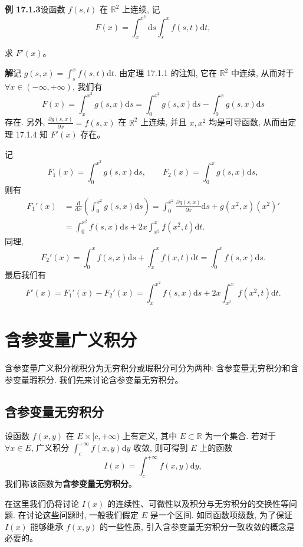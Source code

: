 \documentclass[UTF8, 12pt, fontset=fandol, oneside]{ctexart}
\begin{document}
\noindent\textbf{例 17.1.3}\quad 设函数 $f(s,t)$ 在 $\mathbb R^2$ 上连续, 记
\[
  F(x)=\int_x^{x^2}\mathrm ds\int_s^x f(s,t)\mathrm dt,
\]

\noindent 求 $F'(x)$。

\noindent\textbf{解}\quad 记 $g(s,x)=\int_s^x f(s,t)\mathrm dt$. 由定理 17.1.1 的注知, 它在 $\mathbb R^2$ 中连续, 从而对于 $\forall x\in(-\infty,+\infty)$, 我们有
\[
  F(x)=\int_x^{x^2}g(s,x)\mathrm ds
  =\int_0^{x^2}g(s,x)\mathrm ds-\int_0^x g(s,x)\mathrm ds
\]
存在. 另外, $\frac{\partial g(s,x)}{\partial x}=f(s,x)$ 在 $\mathbb R^2$ 上连续, 并且 $x,x^2$ 均是可导函数, 从而由定理 17.1.4 知 $F'(x)$ 存在。

记
\[
  F_1(x)=\int_0^{x^2}g(s,x)\mathrm ds,\qquad
  F_2(x)=\int_0^x g(s,x)\mathrm ds,
\]
则有
\[
\begin{aligned}
  F_1'(x)
  &=\frac{\mathrm d}{\mathrm dx}\left(\int_0^{x^2}g(s,x)\mathrm ds\right)
    =\int_0^{x^2}\frac{\partial g(s,x)}{\partial x}\mathrm ds
      +g(x^2,x)(x^2)'\\
  &=\int_0^{x^2}f(s,x)\mathrm ds
    +2x\int_{x^2}^x f(x^2,t)\mathrm dt.
\end{aligned}
\]
同理,
\[
  F_2'(x)=\int_0^x f(s,x)\mathrm ds+\int_x^x f(x,t)\mathrm dt
  =\int_0^x f(s,x)\mathrm ds.
\]
最后我们有
\[
  F'(x)=F_1'(x)-F_2'(x)
  =\int_x^{x^2}f(s,x)\mathrm ds+2x\int_{x^2}^x f(x^2,t)\mathrm dt.
\]

\section{含参变量广义积分}

含参变量广义积分视积分为无穷积分或瑕积分可分为两种: 含参变量无穷积分和含参变量瑕积分. 我们先来讨论含参变量无穷积分。

\subsection{含参变量无穷积分}

设函数 $f(x,y)$ 在 $E\times[c,+\infty)$ 上有定义, 其中 $E\subset\mathbb R$ 为一个集合. 若对于 $\forall x\in E$, 广义积分 $\int_c^{+\infty}f(x,y)\mathrm dy$ 收敛, 则可得到 $E$ 上的函数
\[
  I(x)=\int_c^{+\infty}f(x,y)\mathrm dy,
\]
我们称该函数为\textbf{含参变量无穷积分}。

在这里我们仍将讨论 $I(x)$ 的连续性、可微性以及积分与无穷积分的交换性等问题. 在讨论这些问题时, 一般我们假定 $E$ 是一个区间. 如同函数项级数, 为了保证 $I(x)$ 能够继承 $f(x,y)$ 的一些性质, 引入含参变量无穷积分一致收敛的概念是必要的。
\end{document}
